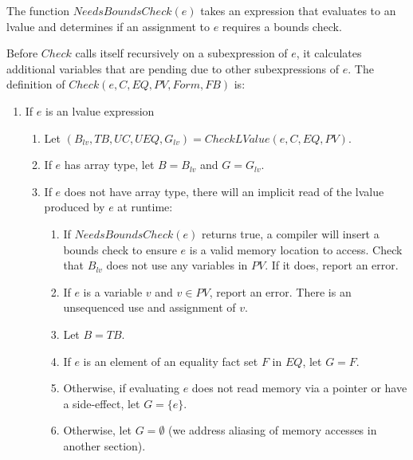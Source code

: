 The function $NeedsBoundsCheck(e)$ takes
an expression that evaluates to an lvalue and determines if an 
assignment to $e$ requires a bounds check.

Before $Check$ calls itself recursively on a subexpression of $e$, it calculates 
additional variables that are pending due to other subexpressions of $e$.
The definition of $Check(e, C, EQ, PV, Form, FB)$ is:
\begin{enumerate}
\item If $e$ is an lvalue expression
\begin{enumerate}
\item Let $(B_{lv}, TB, UC, UEQ, G_{lv}) = CheckLValue(e, C, EQ,PV)$.
\item If $e$ has array type, let $B = B_{lv}$ and $G = G_{lv}$.
\item If $e$ does not have array type, there will an implicit read of the lvalue produced by $e$
at runtime:
\begin{enumerate}
\item If $NeedsBoundsCheck(e)$ returns true, a compiler will insert a bounds check 
to ensure $e$ is a valid memory location to access.  Check that $B_{lv}$ does not use any variables in 
$PV$.  If it does, report an error.
\item If $e$ is a variable $v$ and $v \in PV$, report an error.  There is an unsequenced use and
assignment of $v$.
\item Let $B = TB$. 
\item If $e$ is an element of an equality fact set $F$ in $EQ$, let $G = F$. 
\item Otherwise, if evaluating $e$ does not read memory via a pointer or have a side-effect, let $G = \{ e \}$.  
\item Otherwise, let $G = \emptyset$ (we address aliasing of memory accesses in another section).
\end{enumerate}
\end{enumerate}



\end{enumerate}
